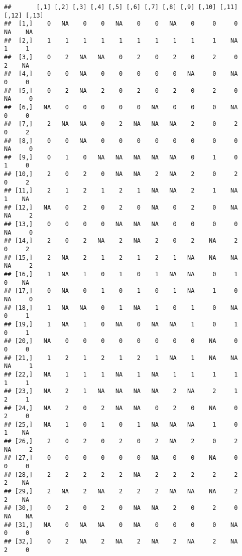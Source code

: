 \documentclass[
]{article}
\begin{document}
\begin{verbatim}
##       [,1] [,2] [,3] [,4] [,5] [,6] [,7] [,8] [,9] [,10] [,11] [,12] [,13]
##  [1,]    0   NA    0    0   NA    0    0   NA    0     0     0    NA    NA
##  [2,]    1    1    1    1    1    1    1    1    1     1    NA     1     1
##  [3,]    0    2   NA   NA    0    2    0    2    0     2     0     2    NA
##  [4,]    0    0   NA    0    0    0    0    0   NA     0    NA     0     0
##  [5,]    0    2   NA    2    0    2    0    2    0     2     0    NA     0
##  [6,]   NA    0    0    0    0    0   NA    0    0     0    NA     0     0
##  [7,]    2   NA   NA    0    2   NA   NA   NA    2     0     2     0     2
##  [8,]    0    0   NA    0    0    0    0    0    0     0     0    NA     0
##  [9,]    0    1    0   NA   NA   NA   NA   NA    0     1     0     1     0
## [10,]    2    0    2    0   NA   NA    2   NA    2     0     2     0     2
## [11,]    2    1    2    1    2    1   NA   NA    2     1    NA     1    NA
## [12,]   NA    0    2    0    2    0   NA    0    2     0    NA    NA     2
## [13,]    0    0    0    0   NA   NA   NA    0    0     0     0    NA     0
## [14,]    2    0    2   NA    2   NA    2    0    2    NA     2     0     2
## [15,]    2   NA    2    1    2    1    2    1   NA    NA    NA    NA     2
## [16,]    1   NA    1    0    1    0    1   NA   NA     0     1     0    NA
## [17,]    0   NA    0    1    0    1    0    1   NA     1     0    NA     0
## [18,]    1   NA   NA    0    1   NA    1    0    1     0    NA     0     1
## [19,]    1   NA    1    0   NA    0   NA   NA    1     0     1     0     1
## [20,]   NA    0    0    0    0    0    0    0    0    NA     0     0     0
## [21,]    1    2    1    2    1    2    1   NA    1    NA    NA    NA     1
## [22,]   NA    1    1    1   NA    1   NA    1    1     1     1     1     1
## [23,]   NA    2    1   NA   NA   NA   NA    2   NA     2     1     2     1
## [24,]   NA    2    0    2   NA   NA    0    2    0    NA     0     2     0
## [25,]   NA    1    0    1    0    1   NA   NA   NA     1     0     1    NA
## [26,]    2    0    2    0    2    0    2   NA    2     0     2    NA     2
## [27,]    0    0    0    0    0    0   NA    0    0    NA     0     0     0
## [28,]    2    2    2    2    2   NA    2    2    2     2     2     2    NA
## [29,]    2   NA    2   NA    2    2    2   NA   NA    NA     2     2    NA
## [30,]    0    2    0    2    0   NA   NA    2    0     2     0    NA    NA
## [31,]   NA    0   NA   NA    0   NA    0    0    0     0    NA     0     0
## [32,]    0    2   NA    2   NA    2   NA    2   NA     2    NA     2     0

\end{verbatim}
\end{document}
